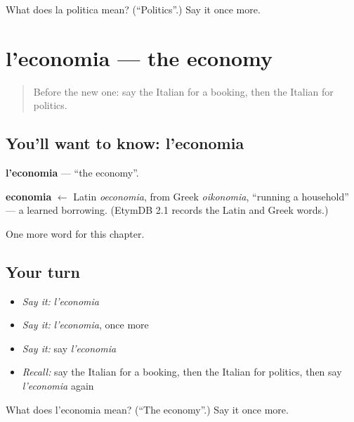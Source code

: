 \begin{tcolorbox}[breakable,colback=teal!4,colframe=teal!35!black,title={Before you move on}]
What does la politica mean? (\textquotedblleft{}Politics\textquotedblright{}.) Say it once more.
\end{tcolorbox}
\section[l'economia]{l'economia — the economy}

\label{lesson:IT-C193-economia}



\begin{quote}
Before the new one: say the Italian for a booking, then the Italian for politics.
\end{quote}

\subsection*{You'll want to know: l'economia}
\textbf{l'economia} — \textquotedblleft{}the economy\textquotedblright{}.

\begin{cousinweb}
\textbf{economia} $\leftarrow$ Latin \emph{oeconomia}, from Greek \emph{oikonomia}, \textquotedblleft{}running a household\textquotedblright{} — a learned borrowing. (EtymDB 2.1 records the Latin and Greek words.)
\end{cousinweb}

\begin{grammarlens}[title={What you've built}]
One more word for this chapter.
\end{grammarlens}

\subsection*{Your turn}
\begin{itemize}
\raggedright
  \item \emph{Say it:} \emph{l'economia}
  \item \emph{Say it:} \emph{l'economia}, once more
  \item \emph{Say it:} say \emph{l'economia}
  \item \emph{Recall:} say the Italian for a booking, then the Italian for politics, then say \emph{l'economia} again
\end{itemize}

\begin{tcolorbox}[breakable,colback=teal!4,colframe=teal!35!black,title={Before you move on}]
What does l'economia mean? (\textquotedblleft{}The economy\textquotedblright{}.) Say it once more.
\end{tcolorbox}

